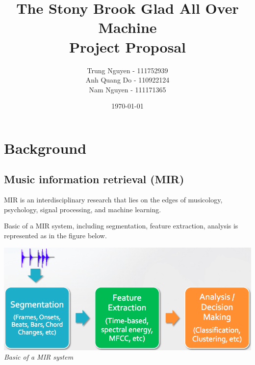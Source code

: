 \documentclass[paper=a4, fontsize=11pt]{scrartcl}
\begin{document}
\title{The Stony Brook Glad All Over Machine\\ Project Proposal}
\author{Trung Nguyen - 111752939
\\Anh Quang Do - 110922124
\\Nam Nguyen - 111171365}
\date{\today}
\maketitle
  
\section{Background}
\subsection{Music information retrieval (MIR)}

MIR is an interdisciplinary research that lies on the edges of musicology, psychology, signal processing, and machine learning. 
%


Basic of a MIR system, including segmentation, feature extraction, analysis is represented as in the figure below.
\begin{center}
\includegraphics[scale=0.2]{img/method.png}\\
\textit{Basic of a MIR system}\\
\end{center}
\end{document}
